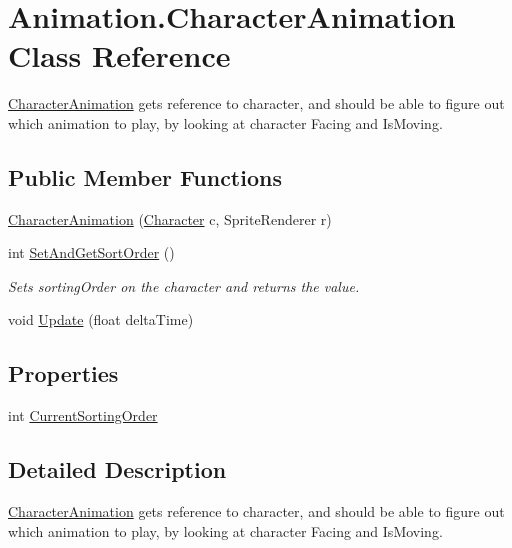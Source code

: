 \hypertarget{class_animation_1_1_character_animation}{}\section{Animation.\+Character\+Animation Class Reference}
\label{class_animation_1_1_character_animation}


\hyperlink{class_animation_1_1_character_animation}{Character\+Animation} gets reference to character, and should be able to figure out which animation to play, by looking at character Facing and Is\+Moving.  


\subsection*{Public Member Functions}
\begin{DoxyCompactItemize}
\item 
\hyperlink{class_animation_1_1_character_animation_a1ff53293719498842dd7afe76e698097}{Character\+Animation} (\hyperlink{class_project_porcupine_1_1_entities_1_1_character}{Character} c, Sprite\+Renderer r)
\item 
int \hyperlink{class_animation_1_1_character_animation_ad12cf170c6d326491ece40d3695977c3}{Set\+And\+Get\+Sort\+Order} ()
\begin{DoxyCompactList}\small\item\em Sets sorting\+Order on the character and returns the value. \end{DoxyCompactList}\item 
void \hyperlink{class_animation_1_1_character_animation_aa6b8e1d5d24188d204a651fea6791421}{Update} (float delta\+Time)
\end{DoxyCompactItemize}
\subsection*{Properties}
\begin{DoxyCompactItemize}
\item 
int \hyperlink{class_animation_1_1_character_animation_ada87b0cf3007bcc24ae26a01392c15b8}{Current\+Sorting\+Order}
\end{DoxyCompactItemize}


\subsection{Detailed Description}
\hyperlink{class_animation_1_1_character_animation}{Character\+Animation} gets reference to character, and should be able to figure out which animation to play, by looking at character Facing and Is\+Moving. 



